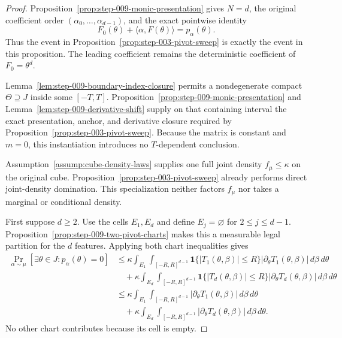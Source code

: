 \begin{proof}
Proposition~\ref{prop:step-009-monic-presentation} gives \(N=d\), the original coefficient order \((\alpha_0,\ldots,\alpha_{d-1})\), and the exact pointwise identity
\begin{equation}
\label{eq:appendix-display-323}
F_0(\theta)+\langle\alpha,F(\theta)\rangle
=p_\alpha(\theta).
\end{equation}
Thus the event in Proposition~\ref{prop:step-003-pivot-sweep} is exactly the event in this proposition. The leading coefficient remains the deterministic coefficient of \(F_0=\theta^d\).

Lemma~\ref{lem:step-009-boundary-index-closure} permits a nondegenerate compact \(\Theta\supseteq J\) inside some \([-T,T]\). Proposition~\ref{prop:step-009-monic-presentation} and Lemma~\ref{lem:step-009-derivative-shift} supply on that containing interval the exact presentation, anchor, and derivative closure required by Proposition~\ref{prop:step-003-pivot-sweep}. Because the matrix is constant and \(m=0\), this instantiation introduces no \(T\)-dependent conclusion.

Assumption~\ref{assump:cube-density-laws} supplies one full joint density \(f_\mu\leq\kappa\) on the original cube. Proposition~\ref{prop:step-003-pivot-sweep} already performs direct joint-density domination. This specialization neither factors \(f_\mu\) nor takes a marginal or conditional density.

First suppose \(d\geq2\). Use the cells \(E_1,E_d\) and define \(E_j=\varnothing\) for \(2\leq j\leq d-1\). Proposition~\ref{prop:step-009-two-pivot-charts} makes this a measurable legal partition for the \(d\) features. Applying both chart inequalities gives
\begin{equation}
\label{eq:appendix-display-324}
\begin{aligned}
\Pr_{\alpha\sim\mu}[\exists\theta\in J:p_\alpha(\theta)=0]
&\leq
\kappa\int_{E_1}\int_{[-R,R]^{d-1}}
\mathbf 1\{\lvert T_1(\theta,\beta)\rvert\leq R\}
\lvert\partial_\theta T_1(\theta,\beta)\rvert\,d\beta\,d\theta\\
&\quad+
\kappa\int_{E_d}\int_{[-R,R]^{d-1}}
\mathbf 1\{\lvert T_d(\theta,\beta)\rvert\leq R\}
\lvert\partial_\theta T_d(\theta,\beta)\rvert\,d\beta\,d\theta\\
&\leq
\kappa\int_{E_1}\int_{[-R,R]^{d-1}}
\lvert\partial_\theta T_1(\theta,\beta)\rvert\,d\beta\,d\theta\\
&\quad+
\kappa\int_{E_d}\int_{[-R,R]^{d-1}}
\lvert\partial_\theta T_d(\theta,\beta)\rvert\,d\beta\,d\theta.
\end{aligned}
\end{equation}
No other chart contributes because its cell is empty.


\end{proof}
